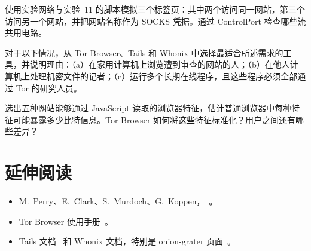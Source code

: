 \begin{esercizio}[2]\label{es:23-isolamento}
使用实验网络与实验~11 的脚本模拟三个标签页：其中两个访问同一网站，第三个访问另一个网站，并把网站名称作为 SOCKS 凭据。通过 ControlPort 检查哪些流共用电路。
\end{esercizio}

\begin{esercizio}[2]\label{es:23-scelta}
对于以下情况，从 Tor Browser、Tails 和 Whonix 中选择最适合所述需求的工具，并说明理由：（a）在家用计算机上浏览遭到审查的网站的人；（b）在他人计算机上处理机密文件的记者；（c）运行多个长期在线程序，且这些程序必须全部通过 Tor 的研究人员。
\end{esercizio}

\begin{esercizio}[3]\label{es:23-impronta}
选出五种网站能够通过 JavaScript 读取的浏览器特征，估计普通浏览器中每种特征可能暴露多少比特信息。Tor Browser 如何将这些特征标准化？用户之间还有哪些差异？
\end{esercizio}

\section*{延伸阅读}
\begin{itemize}
  \item M.~Perry、E.~Clark、S.~Murdoch、G.~Koppen，~\cite{perry2018torbrowser}。
  \item Tor Browser 使用手册~\cite{tbmanual}。
  \item Tails 文档~\cite{tailsabout} 和 Whonix 文档，特别是 onion-grater 页面~\cite{whonixgrater}。
\end{itemize}
